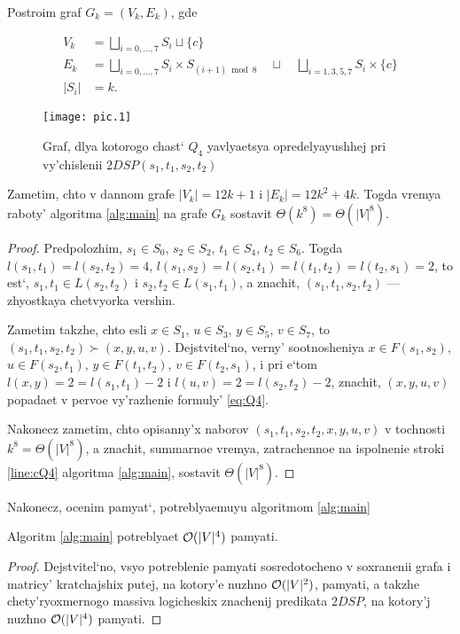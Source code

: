 \begin{theorem}
Postroim graf $G_k = (V_k, E_k)$, gde 

\begin{align}
V_k &= \bigsqcup\limits_{i = 0,\ldots,7} S_i \sqcup \{c\} \\
E_k &= \bigsqcup\limits_{i = 0,\ldots,7} S_i \times S_{(i+1) \bmod 8} \quad\sqcup\quad \bigsqcup\limits_{i=1,3,5,7} S_i \times \{c\} \\
|S_i| &= k.
\end{align}

\begin{figure}[H]
\caption{Graf, dlya kotorogo chast` $Q_4$ yavlyaetsya opredelyayushhej pri vy'chislenii $2DSP(s_1, t_1, s_2, t_2)$}
\centering
\texttt{[image: pic.1]}
\end{figure}

Zametim, chto v dannom grafe $|V_k| = 12k + 1$ i $|E_k| = 12k^2 + 4k$. Togda vremya raboty' algoritma \ref{alg:main} na grafe $G_k$ sostavit $\Theta(k^8) = \Theta(|V|^8)$.

\end{theorem}
\begin{proof}
Predpolozhim, $s_1 \in S_0$, $s_2 \in S_2$, $t_1 \in S_4$, $t_2 \in S_6$. Togda $l(s_1, t_1) = l(s_2, t_2) = 4$, $l(s_1, s_2) = l(s_2, t_1) = l(t_1, t_2) = l(t_2, s_1) = 2$, to est`, $s_1, t_1 \in L(s_2, t_2)$ i $s_2, t_2 \in L(s_1, t_1)$, a znachit, $(s_1, t_1, s_2, t_2)$ --- zhyostkaya chetvyorka vershin.

Zametim takzhe, chto esli $x \in S_1$, $u \in S_3$, $y \in S_5$, $v \in S_7$, to $(s_1, t_1, s_2, t_2) \succ (x, y, u, v)$. Dejstvitel`no, verny' sootnosheniya $x \in F(s_1, s_2)$, $u \in F(s_2, t_1)$, $y \in F(t_1, t_2)$, $v \in F(t_2, s_1)$, i pri e`tom $l(x, y) = 2 = l(s_1, t_1) - 2$ i $l(u, v) = 2 = l(s_2, t_2) - 2$, znachit, $(x, y, u, v)$ popadaet v pervoe vy'razhenie formuly' \ref{eq:Q4}.

Nakonecz zametim, chto opisanny'x naborov $(s_1, t_1, s_2, t_2, x, y, u, v)$ v tochnosti $k^8 = \Theta(|V|^8)$, a znachit, summarnoe vremya, zatrachennoe na ispolnenie stroki \ref{line:cQ4} algoritma \ref{alg:main}, sostavit $\Theta(|V|^8)$.
\end{proof}

Nakonecz, ocenim pamyat`, potreblyaemuyu algoritmom \ref{alg:main}
\begin{theorem}
Algoritm \ref{alg:main} potreblyaet $\mathcal{O}(|V|^4)$ pamyati.
\end{theorem}
\begin{proof}
Dejstvitel`no, vsyo potreblenie pamyati sosredotocheno v soxranenii grafa i matricy' kratchajshix putej, na kotory'e nuzhno $\mathcal{O}(|V|^2)$, pamyati, a takzhe chety'ryoxmernogo massiva logicheskix znachenij predikata $2DSP$, na kotory'j nuzhno $\mathcal{O}(|V|^4)$ pamyati.
\end{proof}

